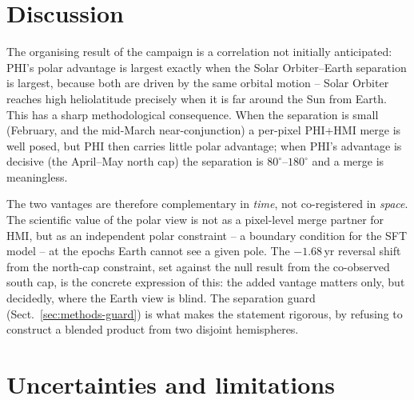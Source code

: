 \documentclass{aa}
\begin{document}
\section{Discussion}
\label{sec:discussion}

The organising result of the campaign is a correlation not initially anticipated: PHI's polar advantage is largest exactly when the Solar Orbiter--Earth separation is largest, because both are driven by the same orbital motion -- Solar Orbiter reaches high heliolatitude precisely when it is far around the Sun from Earth. This has a sharp methodological consequence. When the separation is small (February, and the mid-March near-conjunction) a per-pixel PHI+HMI merge is well posed, but PHI then carries little polar advantage; when PHI's advantage is decisive (the April--May north cap) the separation is $80^{\circ}$--$180^{\circ}$ and a merge is meaningless.

The two vantages are therefore complementary in \emph{time}, not co-registered in \emph{space}. The scientific value of the polar view is not as a pixel-level merge partner for HMI, but as an independent polar constraint -- a boundary condition for the SFT model -- at the epochs Earth cannot see a given pole. The $-1.68$\,yr reversal shift from the north-cap constraint, set against the null result from the co-observed south cap, is the concrete expression of this: the added vantage matters only, but decidedly, where the Earth view is blind. The separation guard (Sect.~\ref{sec:methods-guard}) is what makes the statement rigorous, by refusing to construct a blended product from two disjoint hemispheres.

\section{Uncertainties and limitations}
\label{sec:uncertainties}
\end{document}
